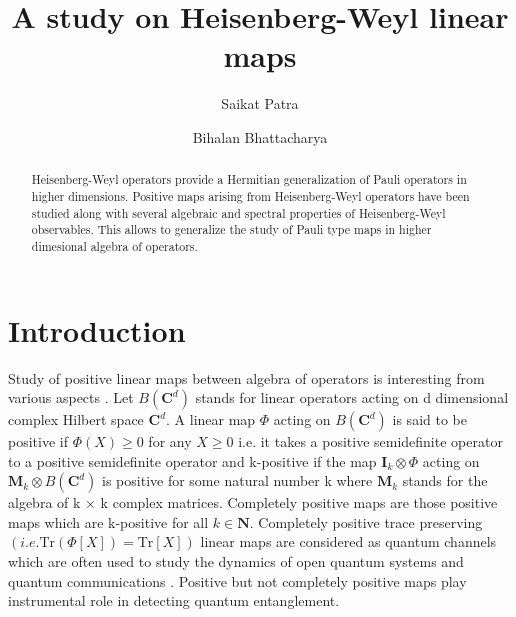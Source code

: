 \documentclass[12pt]{amsart}
\numberwithin{equation}{section}
\begin{document}
\author{Saikat Patra}
\address{Department of Mathematical Sciences, Indian Institute of
Science Education \& Research (IISER) Berhampur, Transit campus,
Berhampur, 760 010, Ganjam, Odisha, India.}

\title{A study on Heisenberg-Weyl linear maps}
\author{Bihalan Bhattacharya}
\address{Institute of Physics, Faculty of Physics, Astronomy and Informatics, Nicolaus Copernicus University, Grudziadzka 5/7, 87-100 Torun, Poland}

\begin{abstract}
 
\par Heisenberg-Weyl operators provide a Hermitian generalization of Pauli operators in higher dimensions. Positive maps arising from Heisenberg-Weyl operators have been studied along with several algebraic and spectral properties of Heisenberg-Weyl observables. This allows to generalize the study of Pauli type maps in higher dimesional algebra of operators.    \\ 




\end{abstract}
\maketitle
	
\section{Introduction}\label{sec:1}
Study of positive linear maps between algebra of operators is interesting from various aspects \cite{book2, book1}. Let $B\left(\mathbf{C}^d\right)$ stands for linear operators acting on d dimensional complex Hilbert space $\mathbf{C}^d$. A linear map $\Phi$ acting on $B\left(\mathbf{C}^d\right)$ is said to be positive if $\Phi (X) \geq 0$ for any $X \geq 0$ i.e. it takes a positive semidefinite operator to a positive semidefinite operator and k-positive if the map $\mathbf{I}_k \otimes \Phi$ acting on $\mathbf{M}_k \otimes B\left(\mathbf{C}^d\right) $ is positive for some natural number k where $\mathbf{M}_k$ stands for the algebra of k $\times$ k complex matrices. Completely positive maps \cite{Stinespring55} are those positive maps which are k-positive for all $k \in \mathbf{N}$. Completely positive trace preserving $\left( i.e.\text{Tr}(\Phi[X])=\text{Tr}[X] \right)$ linear maps are considered as quantum channels which are often used to study the dynamics of open quantum systems \cite{C2022, breuer,rivas1,breuerN,alonso} and quantum communications \cite{NC10,W13,W18}.
Positive but not completely positive maps play instrumental role in detecting quantum entanglement\cite{P96,H96,H97,H09,GT09,CS2014}.\\
\end{document}

